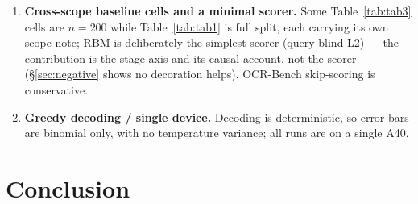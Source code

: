 \documentclass[sigconf,review,anonymous]{acmart}
\begin{document}
\begin{enumerate}
    TextVQA/GQA-scoped (InternVL3 $-4.5 / -3.0$~pp vs none); on DocVQA/OCR, pre
    keeps a large margin over post but still costs $-19.4$~pp / $-99$~pts vs
    none (InternVL3).
  \item \textbf{Cross-scope baseline cells and a minimal scorer.} Some
    Table~\ref{tab:tab3} cells are $n = 200$ while Table~\ref{tab:tab1} is full
    split, each carrying its own scope note; RBM is deliberately the simplest
    scorer (query-blind L2) --- the contribution is the stage axis and its
    causal account, not the scorer (\S\ref{sec:negative} shows no decoration
    helps). OCR-Bench skip-scoring is conservative.
  \item \textbf{Greedy decoding / single device.} Decoding is deterministic, so
    error bars are binomial only, with no temperature variance; all runs are on
    a single A40.
\end{enumerate}

\section{Conclusion}\label{sec:conclusion}
\end{document}
